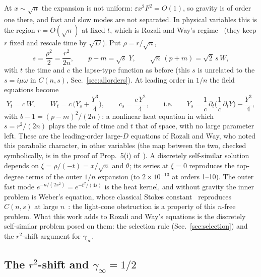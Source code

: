 \documentclass[aps,prd,onecolumn,superscriptaddress,nofootinbib,10pt]{revtex4-2}
\newcommand{\eps}{\varepsilon}
\begin{document}
At $x \sim \sqrt n$ the expansion is not uniform: $\eps x^2F^2 = O(1)$, so gravity is of order one there, and fast and
slow modes are not separated. In physical variables this is the region $r = O(\sqrt n)$ at fixed $t$, which is Rozali
and Way's regime~\cite{RozaliWay2018} (they keep $r$ fixed and rescale time by $\sqrt D$). Put $\rho = r/\sqrt n$,
\begin{equation}
s = \frac{\rho^2}{2} = \frac{r^2}{2n}, \qquad p - m = \sqrt s\;Y, \qquad \sqrt n\,(p + m) = \sqrt2\,s\,W ,
\end{equation}
with $t$ the time and $c$ the lapse-type function as before (this $s$ is unrelated to the $s = i\mu\omega$ in $C(n,s)$,
Sec.~\ref{sec:allorders}). At leading order in $1/n$ the field equations become~\cite[Prop.~5(i)]{math}
\begin{equation}
Y_t = c\,W, \qquad W_t = c\,\Big(Y_s + \frac{Y^3}{4}\Big), \qquad c_s = \frac{c\,Y^2}{4},
\qquad\text{i.e.}\qquad Y_s = \frac1c\,\partial_t\Big(\frac1c\,\partial_t Y\Big) - \frac{Y^3}{4},
\label{eq:heat}
\end{equation}
with $b - 1 = (p - m)^2/(2n)$: a nonlinear heat equation in which $s = r^2/(2n)$ plays the role of time and $t$ that of
space, with no large parameter left. These are the leading-order large-$D$ equations of Rozali and Way, who noted this
parabolic character, in other variables (the map between the two, checked symbolically, is in the proof of
Prop.~5(i) of~\cite{math}). A
discretely self-similar solution depends on $\xi = \rho/(-t) = x/\sqrt n$ and $\theta$; its series at $\xi = 0$
reproduces the top-degree terms of the outer $1/n$ expansion (to $2\times10^{-13}$ at orders 1--10). The outer fast mode
$e^{-n/(2x^2)} = e^{-t^2/(4s)}$ is the heat kernel, and without gravity the inner problem is Weber's equation, whose
classical Stokes constant~\cite{DLMF} reproduces $C(n,s)$ at large $n$~\cite{math}: the light-cone obstruction is a
property of this $n$-free problem. What this work adds to Rozali and Way's equations is the discretely
self-similar problem posed on them: the selection rule (Sec.~\ref{sec:selection}) and the $r^2$-shift argument for
$\gamma_\infty$.

\subsection{The $r^2$-shift and $\gamma_\infty = 1/2$}
\label{sec:r2shift}
\end{document}
